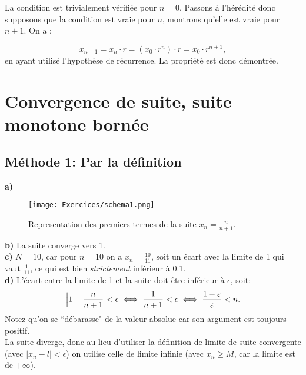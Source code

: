 \documentclass[a4paper, 12pt, french, twoside]{article}
\begin{document}
La condition est trivialement vérifiée pour $n=0$. Passons à l'hérédité donc supposons que la condition est vraie pour $n$, montrons qu'elle est vraie pour $n+1$. On a :

\begin{equation}
    x_{n+1}=x_n\cdot r=(x_0\cdot r^n)\cdot r=x_0\cdot r^{n+1},
\end{equation}
en ayant utilisé l'hypothèse de récurrence. La propriété est donc démontrée.



\section{Convergence de suite, suite monotone bornée}

\subsection{Méthode 1: Par la définition}
\textbf{a)} \\

\begin{figure}[H]
    \centering
    \texttt{[image: Exercices/schema1.png]}
    \caption{Representation des premiers termes de la suite $x_n=\frac{n}{n+1}$.}
    \label{fig:enter-label}
\end{figure}

\textbf{b)} La suite converge vers 1. \\

\textbf{c)} $N = 10$, car pour $n = 10$ on a $x_n =  \frac{10}{11}$, soit un écart avec la limite de 1 qui vaut $\frac{1}{11}$, ce qui est bien \textit{strictement} inférieur à 0.1.\\

\textbf{d)} L'écart entre la limite de 1 et la suite doit être inférieur à $\epsilon$, soit:
\begin{equation}
    \Bigl\lvert 1-\frac{n}{n+1}\Bigl\rvert < \epsilon \iff \frac{1}{n+1} < \epsilon \iff \frac{1-\varepsilon}{\varepsilon}<n.
\end{equation}
Notez qu'on se ``débarasse" de la valeur absolue car son argument est toujours positif. \\

\faLightbulbO \quad {} 
La suite diverge, donc au lieu d'utiliser la définition de limite de suite convergente (avec $|x_n - l| < \epsilon$) on utilise celle de limite infinie (avec $x_n \geq M$, car la limite est de $+ \infty$).
\end{document}
